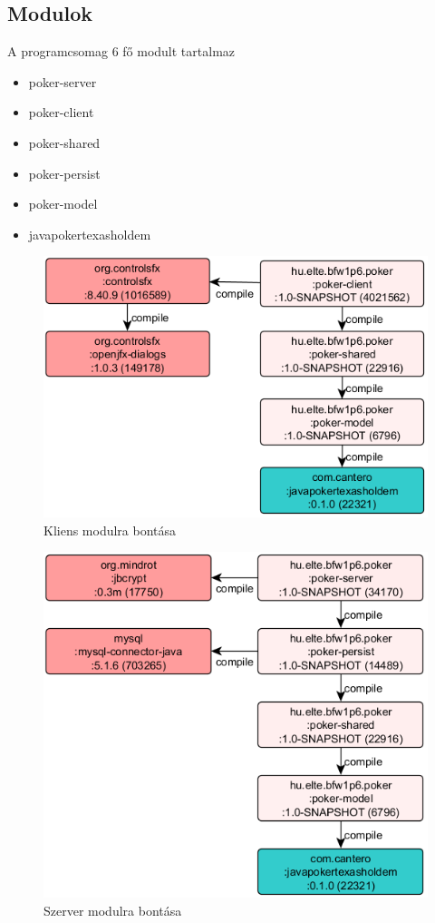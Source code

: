 \subsection{Modulok}
A programcsomag 6 fő modult tartalmaz
\begin{itemize}
  \item poker-server
  \item poker-client
  \item poker-shared
  \item poker-persist
  \item poker-model
  \item javapokertexasholdem
\end{itemize}
\begin{figure}[h!]
	\caption{Kliens modulra bontása}
	\centering
	\includegraphics{user-documentation/images/poker-client-deps.png}
\end{figure}
\begin{figure}[h!]
	\caption{Szerver modulra bontása}
	\centering
	\includegraphics{user-documentation/images/poker-server-deps.png}
\end{figure}
